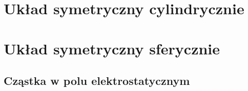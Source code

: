 \documentclass[onecolumn]{article}
\begin{document}
\section{Układ symetryczny cylindrycznie}

\section{Układ symetryczny sferycznie}
\subsection{Cząstka w polu elektrostatycznym}

\end{document}
